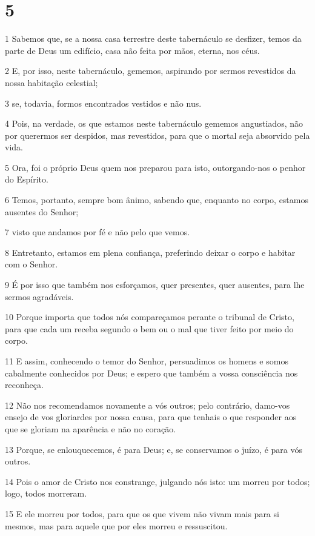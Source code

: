 \chapter{5}

\par 1 Sabemos que, se a nossa casa terrestre deste tabernáculo se desfizer, temos da parte de Deus um edifício, casa não feita por mãos, eterna, nos céus.
\par 2 E, por isso, neste tabernáculo, gememos, aspirando por sermos revestidos da nossa habitação celestial;
\par 3 se, todavia, formos encontrados vestidos e não nus.
\par 4 Pois, na verdade, os que estamos neste tabernáculo gememos angustiados, não por querermos ser despidos, mas revestidos, para que o mortal seja absorvido pela vida.
\par 5 Ora, foi o próprio Deus quem nos preparou para isto, outorgando-nos o penhor do Espírito.
\par 6 Temos, portanto, sempre bom ânimo, sabendo que, enquanto no corpo, estamos ausentes do Senhor;
\par 7 visto que andamos por fé e não pelo que vemos.
\par 8 Entretanto, estamos em plena confiança, preferindo deixar o corpo e habitar com o Senhor.
\par 9 É por isso que também nos esforçamos, quer presentes, quer ausentes, para lhe sermos agradáveis.
\par 10 Porque importa que todos nós compareçamos perante o tribunal de Cristo, para que cada um receba segundo o bem ou o mal que tiver feito por meio do corpo.
\par 11 E assim, conhecendo o temor do Senhor, persuadimos os homens e somos cabalmente conhecidos por Deus; e espero que também a vossa consciência nos reconheça.
\par 12 Não nos recomendamos novamente a vós outros; pelo contrário, damo-vos ensejo de vos gloriardes por nossa causa, para que tenhais o que responder aos que se gloriam na aparência e não no coração.
\par 13 Porque, se enlouquecemos, é para Deus; e, se conservamos o juízo, é para vós outros.
\par 14 Pois o amor de Cristo nos constrange, julgando nós isto: um morreu por todos; logo, todos morreram.
\par 15 E ele morreu por todos, para que os que vivem não vivam mais para si mesmos, mas para aquele que por eles morreu e ressuscitou.

